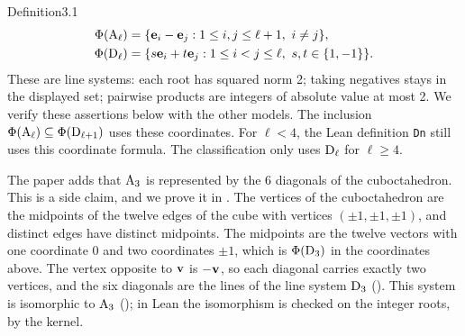 \begin{cgss}{Definition}{3.1}\label{def:3.1}
 \[
 \begin{split}
 \Phi(\typ A_\ell)&=\{\Ze_i-\Ze_j:1\leq i,j\leq\ell+1,\ i\ne j\},\\
 \Phi(\typ D_\ell)&=\{s\Ze_i+t\Ze_j:1\leq i<j\leq\ell,\ s,t\in\{1,-1\}\}.
 \end{split}
 \]
 These are line systems: each root has squared norm 2; taking negatives stays in
 the displayed set; pairwise products are integers of absolute value at most 2.
 We verify these assertions below with the other models.
 The inclusion $\Phi(\mathrm{A}_\ell)\subseteq\Phi(\mathrm{D}_{\ell+1})$ uses these coordinates.
 For $\ell<4$, the Lean definition \texttt{Dn} still uses this coordinate formula.
 The classification only uses $\mathrm{D}_\ell$ for $\ell\geq4$.
\end{cgss}

\begin{remark}
 The paper adds that $\mathrm{A}_3$ is represented by the 6 diagonals of the cuboctahedron. This is
 a side claim, and we prove it in . The vertices of
 the cuboctahedron are the midpoints of the twelve edges of the cube with vertices
 $(\pm1,\pm1,\pm1)$, and distinct edges have distinct midpoints. The midpoints are the twelve
 vectors with one coordinate 0 and two coordinates $\pm1$, which is $\Phi(\mathrm{D}_3)$ in the
 coordinates above. The vertex opposite to ${\mathbf v}$ is $-{\mathbf v}$, so each diagonal carries exactly two
 vertices, and the six diagonals are the lines of the line system $\mathrm{D}_3$
 (). This system is isomorphic to $\mathrm{A}_3$
 (); in Lean the isomorphism is checked on the
 integer roots, by the kernel.
\end{remark}


